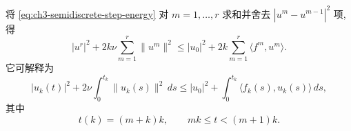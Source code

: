 \begin{Remark}
\label{rem:ch3-semidiscrete-energy-inequality}
将 \eqref{eq:ch3-semidiscrete-step-energy} 对 $m=1,\ldots,r$ 求和并舍去 $|u^m-u^{m-1}|^2$ 项, 得
\begin{equation}
|u^r|^2+2k\nu\sum_{m=1}^r\lVert u^m\rVert^2
\leq|u_0|^2+2k\sum_{m=1}^r\langle f^m,u^m\rangle.
\label{eq:ch3-semidiscrete-discrete-energy-remark}
\end{equation}
它可解释为
\begin{equation}
|u_k(t)|^2+2\nu\int_0^{t_k}\lVert u_k(s)\rVert^2\,ds
\leq|u_0|^2+\int_0^{t_k}\langle f_k(s),u_k(s)\rangle\,ds,
\label{eq:ch3-semidiscrete-functional-energy-remark}
\end{equation}
其中
\begin{equation}
t(k)=(m+k)k,
\qquad mk\leq t<(m+1)k.
\label{eq:ch3-semidiscrete-time-ceiling-source}
\end{equation}
\end{Remark}
